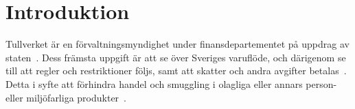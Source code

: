 \section{Introduktion}

Tullverket är en förvaltningsmyndighet under finansdepartementet på
uppdrag av staten~\cite{styrning}. Dess främsta uppgift är att se över Sveriges
varuflöde, och därigenom se till att regler och restriktioner följs, samt att
skatter och andra avgifter betalas~\cite{verksamhet}.
%
Detta i syfte att förhindra handel och smuggling i olagliga eller annars
person- eller miljöfarliga produkter~\cite{wikipedia}.
